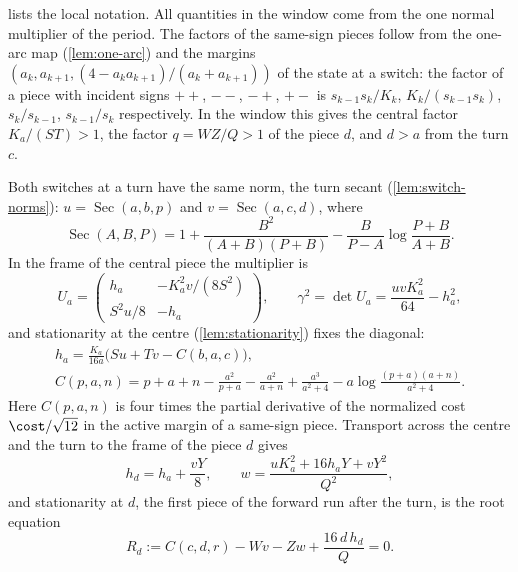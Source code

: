  lists the local notation. All quantities in the window come from the one
normal multiplier of the period. The factors of the same-sign pieces follow from the one-arc map
(\cref{lem:one-arc}) and the margins $(a_k,a_{k+1},(4-a_ka_{k+1})/(a_k+a_{k+1}))$ of the state at a
switch: the factor of a piece with incident signs $++$, $--$, $-+$, $+-$ is $s_{k-1}s_k/K_k$,
$K_k/(s_{k-1}s_k)$, $s_k/s_{k-1}$, $s_{k-1}/s_k$ respectively. In the window this gives
the central factor $K_a/(ST)>1$, the factor $q=WZ/Q>1$ of the piece $d$, and $d>a$ from the turn
$c$.

Both switches at a turn have the same norm, the turn secant (\cref{lem:switch-norms}):
$u=\operatorname{Sec}(a,b,p)$ and $v=\operatorname{Sec}(a,c,d)$, where
\[
\operatorname{Sec}(A,B,P)=1+\frac{B^2}{(A+B)(P+B)}-\frac{B}{P-A}\log\frac{P+B}{A+B}.
\]
In the frame of the central piece the multiplier is
\begin{equation}\label{eq:m2-Ua}
U_a=\begin{pmatrix}h_a&-K_a^2v/(8S^2)\\ S^2u/8&-h_a\end{pmatrix},\qquad
\gamma^2=\det U_a=\frac{uvK_a^2}{64}-h_a^2,
\end{equation}
and stationarity at the centre (\cref{lem:stationarity}) fixes the diagonal:
\begin{equation}\label{eq:m2-ha}
\begin{gathered}
h_a=\frac{K_a}{16a}\bigl(Su+Tv-C(b,a,c)\bigr),\\
C(p,a,n)=p+a+n-\frac{a^2}{p+a}-\frac{a^2}{a+n}+\frac{a^3}{a^2+4}
-a\log\frac{(p+a)(a+n)}{a^2+4}.
\end{gathered}
\end{equation}
Here $C(p,a,n)$ is four times the partial derivative of the normalized cost $\cost/\sqrt{12}$ in
the active margin of a same-sign piece. Transport across the centre and the turn to the frame of
the piece $d$ gives
\begin{equation}\label{eq:m2-transport}
h_d=h_a+\frac{vY}{8},\qquad w=\frac{uK_a^2+16h_aY+vY^2}{Q^2},
\end{equation}
and stationarity at $d$, the first piece of the forward run after the turn, is the root equation
\begin{equation}\label{eq:m2-root}
R_d:=C(c,d,r)-Wv-Zw+\frac{16\,d\,h_d}{Q}=0.
\end{equation}

